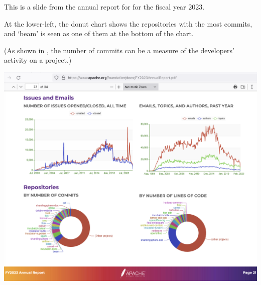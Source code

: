 
This is a slide from the annual report for \Asf for the fiscal year 2023.

At the lower-left, the donut chart shows the repositories with the most commits,
and `beam' is seen as one of them at the bottom of the chart.

(As shown in , the number of commits can be a measure of
the developers' activity on a project.)

\includegraphics[width=\textwidth]{beam-commits}

\pagebreak
